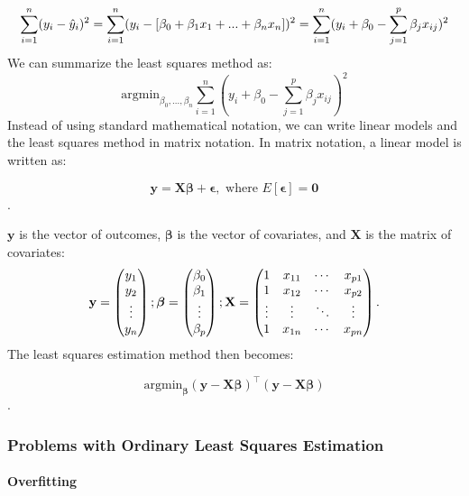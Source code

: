 \documentclass[
]{article}
\begin{document}
\[
\sum_{i=1}^n (y_i - \hat{y}_i)^2 = \sum_{i=1}^n (y_i - [\beta_0 +\beta_1x_1 + \space ...  \space + \beta_nx_n])^2 \\
= \sum_{i=1}^n ( y_i +\beta_0 - \sum_{j=1}^p \beta_jx_{ij} )^2
\] We can summarize the least squares method as: \[
\text{argmin}_{\beta_0,..., \beta_n}\sum_{i=1}^n ( y_i +\beta_0 - \sum_{j=1}^p \beta_jx_{ij} )^2
\] Instead of using standard mathematical notation, we can write linear
models and the least squares method in matrix notation. In matrix
notation, a linear model is written as:

\[\mathbf{y} = \mathbf{X}\boldsymbol\beta  + \boldsymbol\epsilon, \text{ where } E[\boldsymbol\epsilon] = \mathbf{0}\].

\(\mathbf{y}\) is the vector of outcomes, \(\boldsymbol\beta\) is the
vector of covariates, and \(\mathbf{X}\) is the matrix of covariates:
\[\mathbf{y} = \begin{pmatrix} y_1 \\ y_2 \\ \vdots \\ y_n \end{pmatrix}; \space\boldsymbol\beta = \begin{pmatrix} \beta_0 \\ \beta_1 \\ \vdots \\ \beta_p \end{pmatrix}; \space \mathbf{X} = \begin{pmatrix} 1 & x_{11} & \cdots & x_{p1} \\ 1 & x_{12} & \cdots & x_{p2} \\ \vdots & \vdots & \ddots & \vdots \\ 1 & x_{1n} & \cdots & x_{pn} \end{pmatrix}.\]
The least squares estimation method then becomes:

\[\text{argmin}_{\boldsymbol\beta} (\mathbf{y} - \mathbf{X}\boldsymbol\beta)^\top(\mathbf{y} - \mathbf{X}\boldsymbol\beta)\].

\hypertarget{problems-with-ordinary-least-squares-estimation}{%
\subsubsection{Problems with Ordinary Least Squares
Estimation}\label{problems-with-ordinary-least-squares-estimation}}

\hypertarget{overfitting}{%
\paragraph{Overfitting}\label{overfitting}}
\end{document}
